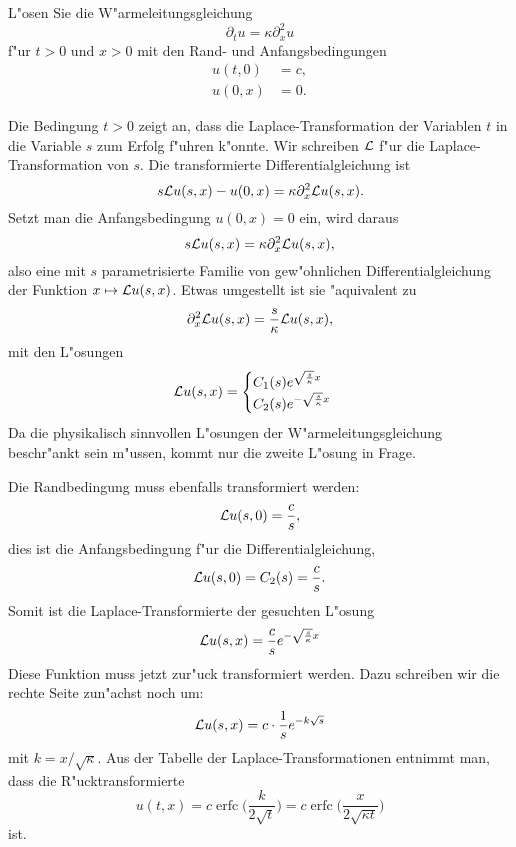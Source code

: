 L"osen Sie die W"armeleitungsgleichung
\[
\partial_t u=\kappa\partial_x^2u
\]
f"ur $t>0$ und $x>0$ mit den Rand- und Anfangsbedingungen
\begin{align*}
u(t,0)&=c,\\
u(0,x)&=0.
\end{align*}

\begin{loesung}
Die Bedingung $t>0$ zeigt an, dass die Laplace-Transformation
der Variablen $t$ in die Variable $s$ zum Erfolg f"uhren k"onnte.
Wir schreiben $\cal L$ f"ur die Laplace-Transformation von $s$.
Die transformierte Differentialgleichung ist
\[
s{\cal L}u(s, x)-u(0,x)=\kappa \partial_x^2{\cal L}u(s,x).
\]
Setzt man die Anfangsbedingung $u(0,x)=0$ ein, wird daraus
\[
s{\cal L}u(s, x)=\kappa \partial_x^2{\cal L}u(s,x),
\]
also eine mit $s$ parametrisierte Familie von gew"ohnlichen
Differentialgleichung der Funktion $x\mapsto {\cal L}u(s,x)$.
Etwas umgestellt ist sie "aquivalent zu
\[
\partial_x^2{\cal L}u(s,x)
=
\frac{s}{\kappa}{\cal L}u(s, x),
\]
mit den L"osungen
\[
{\cal L}u(s,x)=\begin{cases}
C_1(s)e^{\sqrt{\frac{s}{\kappa}}x}\\
C_2(s)e^{-\sqrt{\frac{s}{\kappa}}x}
\end{cases}
\]
Da die physikalisch sinnvollen L"osungen der W"armeleitungsgleichung
beschr"ankt sein m"ussen, kommt nur die zweite L"osung in Frage.

Die Randbedingung muss ebenfalls transformiert werden:
\[
{\cal L}u(s,0)=\frac{c}{s},
\]
dies ist die Anfangsbedingung f"ur die Differentialgleichung,
\[
{\cal L}u(s,0)=C_2(s)=\frac{c}{s}.
\]
Somit ist die Laplace-Transformierte der gesuchten L"osung
\[
{\cal L}u(s,x)=\frac{c}{s}e^{-\sqrt{\frac{s}{\kappa}}x}
\]
Diese Funktion muss jetzt zur"uck transformiert werden.
Dazu schreiben wir die rechte Seite zun"achst noch um:
\[
{\cal L}u(s,x)=c\cdot \frac{1}{s}e^{-k\sqrt{s}}
\]
mit $k=x/\sqrt{\kappa}$.
Aus der
Tabelle der Laplace-Transformationen entnimmt man, dass die
R"ucktransformierte
\[
u(t,x)
=
c \operatorname{erfc}\biggl(
\frac{k}{2\sqrt{t}}
\biggr)
=
c \operatorname{erfc}\biggl(
\frac{x}{2\sqrt{\kappa t}}
\biggr)
\]
ist.
\end{loesung}
